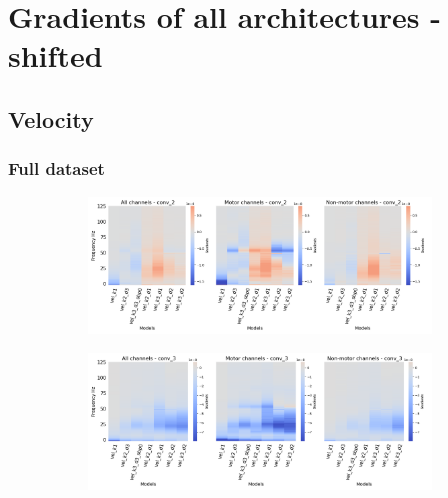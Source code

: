 \chapter{Gradients of all architectures - shifted}\label{appendixB}

\section*{Velocity}\label{sec:velocity-appendixB}

\subsection*{Full dataset}\label{subsec:vel-full-dataset-appendixB}
\begin{figure}[!htpb]
\centering
\begin{subfigure}[b]{\textwidth}
   \includegraphics[width=0.85\linewidth]{img/appendix/A/conv-2/sm/vel-model-gradients-all_kinds}
   \caption{}
   \label{fig:vel-shifted-grads-conv-2}
\end{subfigure}

\begin{subfigure}[b]{\textwidth}
   \includegraphics[width=0.85\linewidth]{img/appendix/A/conv-3/sm/vel-model-gradients-all_kinds}
   \caption{}
   \label{fig:vel-shifted-grads-conv-3}
\end{subfigure}
\end{figure}
\clearpage   

